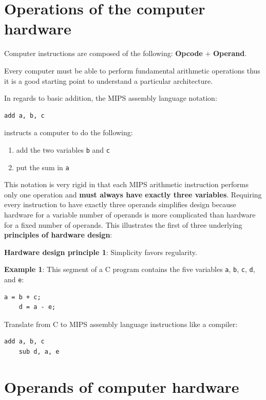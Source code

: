 \documentclass[10pt,a4paper]{article}
\begin{document}
\section{Operations of the computer hardware}

Computer instructions are composed of the following: \textbf{Opcode} $+$ \textbf{Operand}.

Every computer must be able to perform fundamental arithmetic operations thus it is a good starting
point to understand a particular architecture.

In regards to basic addition, the MIPS assembly language notation:
\begin{lstlisting}[numbers=none]
    add a, b, c
\end{lstlisting}
instructs a computer to do the following:
\begin{enumerate}
    \item add the two variables \texttt{b} and \texttt{c}
    \item put the sum in \texttt{a}
\end{enumerate}
This notation is very rigid in that each MIPS arithmetic instruction performs only one operation and
\textbf{must always have exactly three variables}. Requiring every instruction to have exactly three
operands simplifies design because hardware for a variable number of operands is more complicated
than hardware for a fixed number of operands. This illustrates the first of three underlying
\textbf{principles of hardware design}:
\begin{tcolorbox}[breakable,colback=white]
\textbf{Hardware design principle 1}: Simplicity favors regularity.
\end{tcolorbox}

\textbf{Example 1}: This segment of a C program contains the five variables \texttt{a}, \texttt{b},
\texttt{c}, \texttt{d}, and \texttt{e}:
\begin{lstlisting}[numbers=none]
    a = b + c;
    d = a - e;
\end{lstlisting}
Translate from C to MIPS assembly language instructions like a compiler:
\begin{lstlisting}[numbers=none]
    add a, b, c
    sub d, a, e
\end{lstlisting}

\section{Operands of computer hardware}
\end{document}
